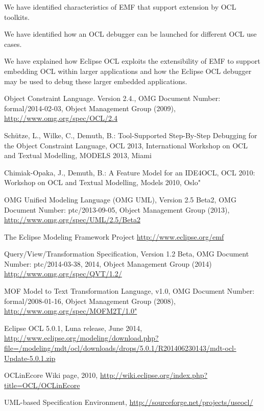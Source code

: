 \documentclass[a4paper]{article}
\begin{document}
We have identified characteristics of EMF that support extension by OCL toolkits.

We have identified how an OCL debugger can be launched for different OCL use cases.

We have explained how Eclipse OCL exploits the extensibility of EMF to support embedding OCL within larger applications and how the Eclipse OCL debugger may be used to debug these larger embedded applications.


% 
%

\begin{thebibliography}{11}

 Object Constraint Language. Version 2.4., OMG Document Number: formal/2014-02-03, Object Management Group (2009),  \url{http://www.omg.org/spec/OCL/2.4}

 Sch\"utze, L., Wilke, C., Demuth, B.: Tool-Supported Step-By-Step Debugging
for the Object Constraint Language, OCL 2013, International Workshop on OCL and Textual Modelling, MODELS 2013, Miami

 Chimiak-Opaka, J., Demuth, B.: A Feature Model for an IDE4OCL, OCL 2010: Workshop on OCL and Textual Modelling, Models 2010, Oslo"

 OMG Unified Modeling Language (OMG UML), Version 2.5 Beta2, {OMG Document Number}: ptc/2013-09-05, Object Management Group (2013), \url{http://www.omg.org/spec/UML/2.5/Beta2}

 The Eclipse Modeling Framework Project \url{http://www.eclipse.org/emf}

 Query/View/Transformation Specification, Version 1.2 Beta, {OMG Document Number}: ptc/2014-03-38, 2014, Object Management Group (2014) \url{http://www.omg.org/spec/QVT/1.2/}

 MOF Model to Text Transformation Language,  v1.0, {OMG Document Number}: formal/2008-01-16, Object Management Group (2008), \url{http://www.omg.org/spec/MOFM2T/1.0"}

 Eclipse OCL 5.0.1, Luna release, June 2014, \url{http://www.eclipse.org/modeling/download.php?file=/modeling/mdt/ocl/downloads/drops/5.0.1/R201406230143/mdt-ocl-Update-5.0.1.zip}

 OCLinEcore Wiki page, 2010, \url{http://wiki.eclipse.org/index.php?title=OCL/OCLinEcore}

 UML-based Specification Environment, \url{http://sourceforge.net/projects/useocl/}

\end{thebibliography}
\end{document}
